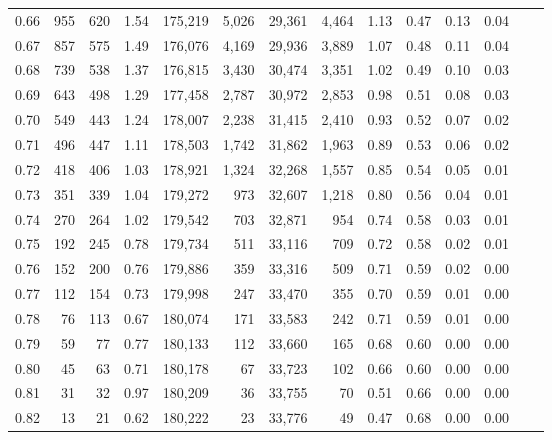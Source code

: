 \begin{tabular}{rrrrrrrrrrrrrr}
0.66 &    955 &    620 &    1.54 &  175,219 &    5,026 &  29,361 &   4,464 &  1.13 &  0.47 &  0.13 &      0.04 \\
0.67 &    857 &    575 &    1.49 &  176,076 &    4,169 &  29,936 &   3,889 &  1.07 &  0.48 &  0.11 &      0.04 \\
0.68 &    739 &    538 &    1.37 &  176,815 &    3,430 &  30,474 &   3,351 &  1.02 &  0.49 &  0.10 &      0.03 \\
0.69 &    643 &    498 &    1.29 &  177,458 &    2,787 &  30,972 &   2,853 &  0.98 &  0.51 &  0.08 &      0.03 \\
0.70 &    549 &    443 &    1.24 &  178,007 &    2,238 &  31,415 &   2,410 &  0.93 &  0.52 &  0.07 &      0.02 \\
0.71 &    496 &    447 &    1.11 &  178,503 &    1,742 &  31,862 &   1,963 &  0.89 &  0.53 &  0.06 &      0.02 \\
0.72 &    418 &    406 &    1.03 &  178,921 &    1,324 &  32,268 &   1,557 &  0.85 &  0.54 &  0.05 &      0.01 \\
0.73 &    351 &    339 &    1.04 &  179,272 &      973 &  32,607 &   1,218 &  0.80 &  0.56 &  0.04 &      0.01 \\
0.74 &    270 &    264 &    1.02 &  179,542 &      703 &  32,871 &     954 &  0.74 &  0.58 &  0.03 &      0.01 \\
0.75 &    192 &    245 &    0.78 &  179,734 &      511 &  33,116 &     709 &  0.72 &  0.58 &  0.02 &      0.01 \\
0.76 &    152 &    200 &    0.76 &  179,886 &      359 &  33,316 &     509 &  0.71 &  0.59 &  0.02 &      0.00 \\
0.77 &    112 &    154 &    0.73 &  179,998 &      247 &  33,470 &     355 &  0.70 &  0.59 &  0.01 &      0.00 \\
0.78 &     76 &    113 &    0.67 &  180,074 &      171 &  33,583 &     242 &  0.71 &  0.59 &  0.01 &      0.00 \\
0.79 &     59 &     77 &    0.77 &  180,133 &      112 &  33,660 &     165 &  0.68 &  0.60 &  0.00 &      0.00 \\
0.80 &     45 &     63 &    0.71 &  180,178 &       67 &  33,723 &     102 &  0.66 &  0.60 &  0.00 &      0.00 \\
0.81 &     31 &     32 &    0.97 &  180,209 &       36 &  33,755 &      70 &  0.51 &  0.66 &  0.00 &      0.00 \\
0.82 &     13 &     21 &    0.62 &  180,222 &       23 &  33,776 &      49 &  0.47 &  0.68 &  0.00 &      0.00 \\

\end{tabular}
